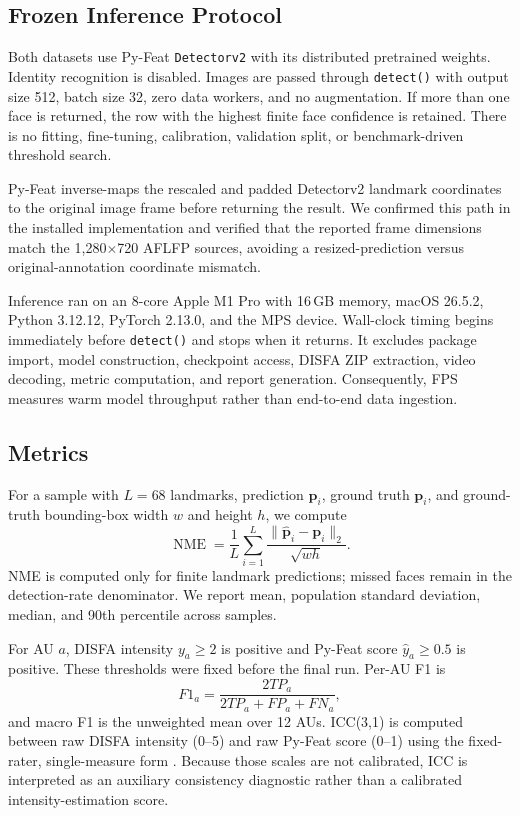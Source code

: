 \documentclass[10pt,journal]{IEEEtran}
\newcommand{\code}[1]{\texttt{#1}}
\newcommand{\nme}{\operatorname{NME}}
\begin{document}
\subsection{Frozen Inference Protocol}

Both datasets use Py-Feat \PyFeatVersion{} \code{Detectorv2} with its
distributed pretrained weights. Identity recognition is disabled. Images are
passed through \code{detect()} with output size 512, batch size 32, zero data
workers, and no augmentation. If more than one face is returned, the row with
the highest finite face confidence is retained. There is no fitting,
fine-tuning, calibration, validation split, or benchmark-driven threshold
search.

Py-Feat inverse-maps the rescaled and padded Detectorv2 landmark coordinates
to the original image frame before returning the result. We confirmed this
path in the installed implementation and verified that the reported frame
dimensions match the 1,280$\times$720 AFLFP sources, avoiding a
resized-prediction versus original-annotation coordinate mismatch.

Inference ran on an 8-core Apple M1 Pro with 16\,GB memory, macOS 26.5.2,
Python 3.12.12, PyTorch 2.13.0, and the MPS device. Wall-clock timing begins
immediately before \code{detect()} and stops when it returns. It excludes
package import, model construction, checkpoint access, DISFA ZIP extraction,
video decoding, metric computation, and report generation. Consequently, FPS
measures warm model throughput rather than end-to-end data ingestion.

\subsection{Metrics}

For a sample with $L=68$ landmarks, prediction $\hat{\mathbf{p}}_i$,
ground truth $\mathbf{p}_i$, and ground-truth bounding-box width $w$ and
height $h$, we compute
\begin{equation}
  \nme =
  \frac{1}{L}\sum_{i=1}^{L}
  \frac{\lVert \hat{\mathbf{p}}_i-\mathbf{p}_i\rVert_2}
       {\sqrt{wh}}.
  \label{eq:nme}
\end{equation}
NME is computed only for finite landmark predictions; missed faces remain in
the detection-rate denominator. We report mean, population standard
deviation, median, and 90th percentile across samples.

For AU $a$, DISFA intensity $y_a \geq 2$ is positive and Py-Feat score
$\hat{y}_a \geq 0.5$ is positive. These thresholds were fixed before the
final run. Per-AU F1 is
\begin{equation}
  F1_a = \frac{2TP_a}{2TP_a+FP_a+FN_a},
\end{equation}
and macro F1 is the unweighted mean over 12 AUs. ICC(3,1) is computed between
raw DISFA intensity (0--5) and raw Py-Feat score (0--1) using the fixed-rater,
single-measure form \cite{shrout1979icc}. Because those scales are not
calibrated, ICC is interpreted as an auxiliary consistency diagnostic rather
than a calibrated intensity-estimation score.
\end{document}

